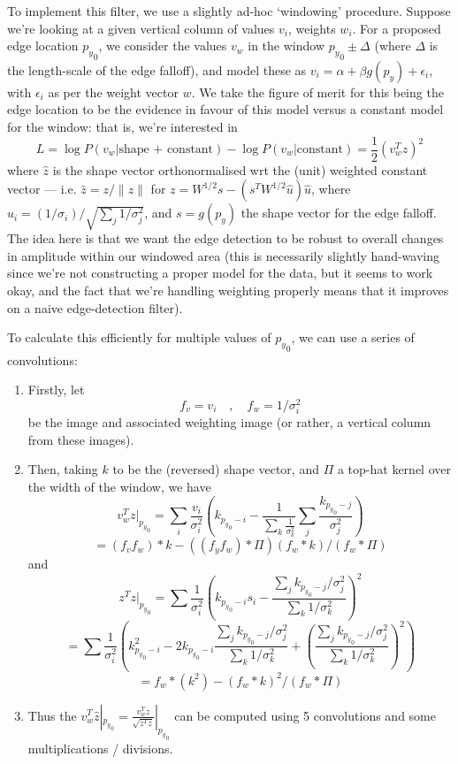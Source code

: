 To implement this filter, we use a slightly ad-hoc `windowing'
procedure. Suppose we're looking at a given vertical column of values
$v_i$, weights $w_i$. For a proposed edge location ${p_y}_0$, we
consider the values $v_w$ in the window ${p_y}_0 \pm \Delta$ (where $\Delta$
is the length-scale of the edge falloff), and model these as $v_i =
\alpha + \beta g(p_y) + \epsilon_i$, with $\epsilon_i$ as per the weight
vector $w$. We take the figure of merit for this being the edge location
to be the evidence in favour of this model versus a constant model for
the window: that is, we're interested in
\[
L = \log P(v_w|{\mbox{shape + constant}}) - \log P(v_w|{\mbox{constant}}) = \frac{1}{2} (v_w^T \hat z)^2
\]
where $\hat z$ is the shape vector orthonormalised wrt the (unit)
weighted constant vector --- i.e. $\hat z = z / \| z \|$ for $z =
W^{1/2} s - (s^T W^{1/2} \hat u) \hat u$, where $\hat u_i = (1/\sigma_i)
/ \sqrt{\sum_j 1/\sigma_j^2}$, and $s = g(p_y)$ the shape vector for the edge falloff. The
idea here is that we want the edge detection to be robust to overall
changes in amplitude within our windowed area (this is necessarily
slightly hand-waving since we're not constructing a proper model for
the data, but it seems to work okay, and the fact that we're handling
weighting properly means that it improves on a naive edge-detection
filter).

To calculate this efficiently for multiple values of ${p_y}_0$, we can
use a series of convolutions:
\begin{enumerate}
\item Firstly, let
\[
f_v = v_i \quad , \quad f_w = 1/\sigma_i^2
\]
be the image and associated weighting image (or rather, a vertical
column from these images).
%
\item Then, taking $k$ to be the (reversed) shape vector, and $\Pi$ a
top-hat kernel over the width of the window, we have
\[
v_w^T z |_{{p_y}_0} 
= \sum_i \frac{v_i}{\sigma_i^2} \left(k_{{p_y}_0-i} - \frac{1}{\sum_k \frac{1}{\sigma_k^2}}
\sum_j \frac{k_{{p_y}_0-j}}{\sigma_j^2}\right)
\]
\[
= (f_v f_w) * k - ((f_y f_w) * \Pi)(f_w * k) / (f_w * \Pi)
\]
and
\[
z^T z |_{{p_y}_0}
= 
\sum \frac{1}{\sigma_i^2}\left(k_{{p_y}_0-i}s_i - \frac{\sum_j k_{{p_y}_0-j}/\sigma_j^2}
{\sum_k 1/\sigma_k^2}\right)^2
\]
\[
=
\sum \frac{1}{\sigma_i^2}\left(k_{{p_y}_0-i}^2 - 2 k_{{p_y}_0-i} \frac{\sum_j k_{{p_y}_0-j}/\sigma_j^2}
{\sum_k 1/\sigma_k^2} + \left(\frac{\sum_j k_{{p_y}_0-j}/\sigma_j^2}
{\sum_k 1/\sigma_k^2}\right)^2\right)
\]
\[
 = f_w * (k^2) - (f_w * k)^2 / (f_w * \Pi)
\]
%
\item Thus the $v_w^T \hat z |_{{p_y}_0} = \frac{v_w^T z}{\sqrt{z^T z}}|_{{p_y}_0}$
can be computed using 5 convolutions and some multiplications / divisions.
\end{enumerate}

